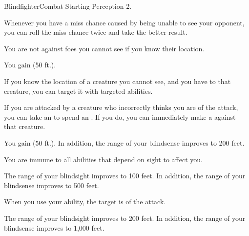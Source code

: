     \begin{feat}{Blindfighter}{Combat}
        \featpre Starting Perception 2.
        \featben
        
         Whenever you have a miss chance caused by being unable to see your opponent, you can roll the miss chance twice and take the better result.

         You are not  against foes you cannot see if you know their location.

         You gain  (50 ft.).

         If you know the location of a creature you cannot see, and you have  to that creature, you can target it with targeted abilities.

         If you are attacked by a creature who incorrectly thinks you are  of the attack, you can take an  to spend an .
        If you do, you can immediately make a  against that creature.

         You gain  (50 ft.).
        In addition, the range of your blindsense improves to 200 feet. 

         You are immune to all abilities that depend on sight to affect you.

         The range of your blindsight improves to 100 feet.
        In addition, the range of your blindsense improves to 500 feet.

         When you use your  ability, the target is  of the attack.

         The range of your blindsight improves to 200 feet.
        In addition, the range of your blindsense improves to 1,000 feet.
    \end{feat}

